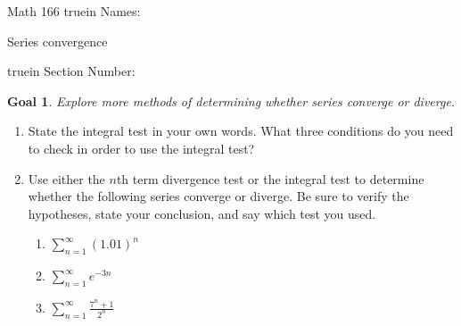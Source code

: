 \documentclass[12pt]{article}
\newtheorem*{goal}{Goal}
\begin{document}
\pagestyle{empty} %

\noindent
{Math 166 
  truein  Names:\ \hrulefill}

\noindent
{Series convergence}

\noindent  {} truein  Section Number:\ \hrulefill
\medskip

\begin{goal} \rm
Explore more methods of determining whether series converge or diverge. 
\end{goal}

\begin{enumerate}
\item State the integral test in your own words. What three conditions do you need to check in order to use the integral test?


\vspace{.7in}
\item Use either the $n$th term divergence test or the integral test to determine whether the following series converge or diverge. Be sure to verify the hypotheses, state your conclusion, and say which test you used. 
\begin{enumerate}
\item $\displaystyle\sum_{n=1}^{\infty} (1.01)^n$

\vspace{2.5in}

\item $\displaystyle\sum_{n=1}^{\infty} e^{-3n}$


\vspace{2.5in}
\item $\displaystyle\sum_{n=1}^{\infty} \frac{7^n+1}{2^n}$


\end{enumerate}
\end{enumerate}
\end{document}
